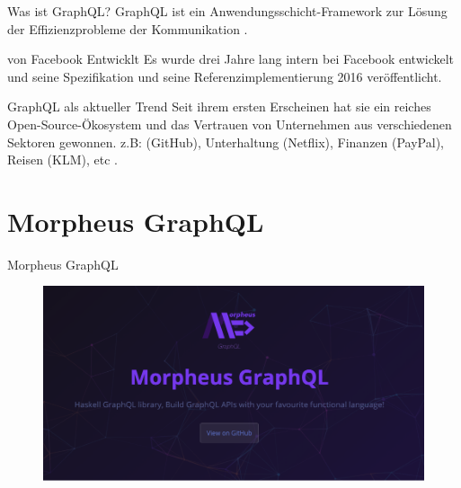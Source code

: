 \begin{frame}{}

    \footnotesize

    \begin{block}{Was ist GraphQL?}
        GraphQL ist ein Anwendungsschicht-Framework zur Lösung der Effizienzprobleme der Kommunikation \cite{gql-iot}.         
    \end{block}

    \begin{block}{von Facebook Entwicklt}
        Es wurde drei Jahre lang intern bei Facebook entwickelt und seine Spezifikation und seine Referenzimplementierung 2016 veröffentlicht.
        \cite{initial-analysis-of-gql}
    \end{block}

    \begin{block}{GraphQL als aktueller Trend}
        Seit ihrem ersten Erscheinen hat sie ein reiches Open-Source-Ökosystem und das Vertrauen von Unternehmen aus verschiedenen Sektoren gewonnen. z.B: (GitHub), Unterhaltung (Netflix), Finanzen (PayPal), Reisen (KLM), etc \cite{morph-gql-1,gql-healthcare}.
    \end{block}

\end{frame}


\section{Morpheus GraphQL}
\begin{frame}{Morpheus GraphQL}
    \begin{figure}
        \centering
        \includegraphics[width=1.1\textwidth]{assets/img/morpheus-graphql-bg.png}
    \end{figure}
\end{frame}